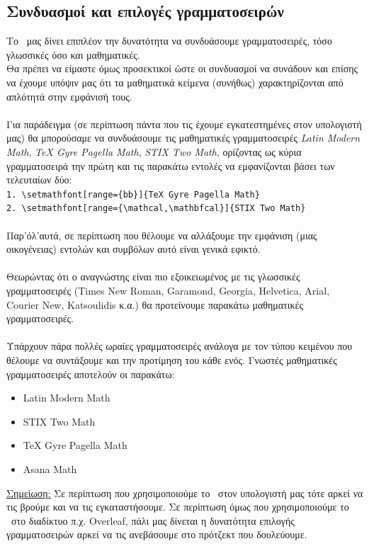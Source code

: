 \documentclass[a4paper, 12pt, oneside, xelatex, final]{article}
\begin{document}
	\subsection{Συνδυασμοί και επιλογές γραμματοσειρών}
	\noindent Το \XeLaTeX\ μας δίνει επιπλέον την δυνατότητα να συνδυάσουμε γραμματοσειρές, τόσο γλωσσικές όσο και μαθηματικές.\\
		Θα πρέπει να είμαστε όμως προσεκτικοί ώστε οι συνδυασμοί να συνάδουν και επίσης να έχουμε υπόψιν μας ότι τα μαθηματικά κείμενα (συνήθως) χαρακτηρίζονται από απλότητά στην εμφάνισή τους.\\ \\
	Για παράδειγμα (σε περίπτωση πάντα που τις έχουμε εγκατεστημένες στον υπολογιστή μας) θα μπορούσαμε να συνδυάσουμε τις μαθηματικές γραμματοσειρές \emph{Latin Modern Math}, \emph{TeX Gyre Pagella Math}, \emph{STIX Two Math}, ορίζοντας ως κύρια γραμματοσειρά την πρώτη και τις παρακάτω εντολές να εμφανίζονται βάσει των τελευταίων δύο:\\
	\verb+1. \setmathfont[range={bb}]{TeX Gyre Pagella Math}+\\
	\verb+2. \setmathfont[range={\mathcal,\mathbfcal}]{STIX Two Math}+\\ \\
	Παρ'όλ'αυτά, σε περίπτωση που θέλουμε να αλλάξουμε την εμφάνιση (μιας οικογένειας) εντολών και συμβόλων αυτό είναι γενικά εφικτό.\\ \\
	Θεωρώντας ότι ο αναγνώστης είναι πιο εξοικειωμένος με τις γλωσσικές γραμματοσειρές (Times New Roman, Garamond, Georgia, Helvetica, Arial, Courier New, Katsoulidis κ.α.) θα προτείνουμε παρακάτω μαθηματικές γραμματοσειρές.\\ \\
	Υπάρχουν πάρα πολλές ωραίες γραμματοσειρές ανάλογα με τον τύπου κειμένου που θέλουμε να συντάξουμε και την προτίμηση του κάθε ενός. Γνωστές μαθηματικές γραμματοσειρές αποτελούν οι παρακάτω:
	\begin{itemize}
		\item Latin Modern Math
		\item STIX Two Math
		\item TeX Gyre Pagella Math
		\item Asana Math
	\end{itemize}
	\underline{Σημείωση:} Σε περίπτωση που χρησιμοποιούμε το \XeLaTeX\ στον υπολογιστή μας τότε αρκεί να τις βρούμε και να τις εγκαταστήσουμε. Σε περίπτωση όμως που χρησιμοποιούμε το \XeLaTeX\ στο διαδίκτυο π.χ. Overleaf, πάλι μας δίνεται η δυνατότητα επιλογής γραμματοσειρών αρκεί να τις ανεβάσουμε στο πρότζεκτ που δουλεύουμε.
		
\end{document}

